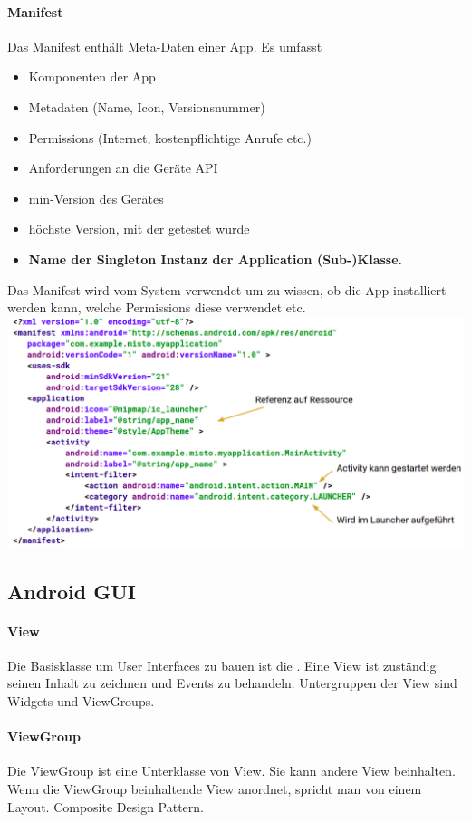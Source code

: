 \paragraph{Manifest} Das Manifest enthält Meta-Daten einer App. Es umfasst
\begin{itemize}
\item Komponenten der App
\item Metadaten (Name, Icon, Versionsnummer)
\item Permissions (Internet, kostenpflichtige Anrufe etc.)
\item Anforderungen an die Geräte API
\item {} min-Version des Gerätes
\item {} höchste Version, mit der getestet wurde
\item \textbf{Name der Singleton Instanz der Application (Sub-)Klasse.}
\end{itemize}

Das Manifest wird vom System verwendet um zu wissen, ob die App installiert werden kann, welche Permissions diese verwendet etc.
\includegraphics[scale=0.17]{img/manifest.png}

\subsection{Android GUI}
\paragraph{View} Die Basisklasse um User Interfaces zu bauen ist die . Eine View ist zuständig seinen Inhalt zu zeichnen und Events zu behandeln. Untergruppen der View sind Widgets und ViewGroups. 
\paragraph{ViewGroup} Die ViewGroup ist eine Unterklasse von View. Sie kann andere View beinhalten. Wenn die ViewGroup beinhaltende View anordnet, spricht man von einem Layout. Composite Design Pattern.
